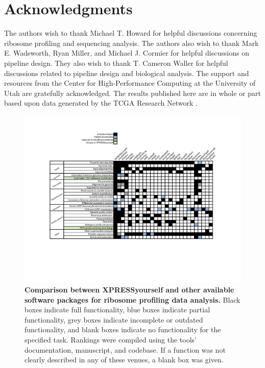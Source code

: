 \documentclass[10pt, oneside]{article}
\newcommand{\beginsupplement}{%
  \setcounter{table}{0}
  \renewcommand{\thetable}{S\arabic{table}}%
  \setcounter{figure}{0}
  \renewcommand{\thefigure}{S\arabic{figure}}%
}
\begin{document}
\section*{Acknowledgments}
The authors wish to thank Michael T. Howard for helpful discussions concerning ribosome profiling and sequencing analysis. The authors also wish to thank Mark E. Wadsworth, Ryan Miller, and Michael J. Cormier for helpful discussions on pipeline design. They also wish to thank T. Cameron Waller for helpful discussions related to pipeline design and biological analysis. The support and resources from the Center for High-Performance Computing at the University of Utah are gratefully acknowledged. The results published here are in whole or part based upon data generated by the TCGA Research Network \cite{tcga}.\\




\newpage
\beginsupplement

\begin{figure}
\centering
  \includegraphics[width=180mm]{figures/xpresspipe_supplement1.png}
  \caption{\textbf{Comparison between XPRESSyourself and other available software packages for ribosome profiling data analysis.} Black boxes indicate full functionality, blue boxes indicate partial functionality, grey boxes indicate incomplete or outdated functionality, and blank boxes indicate no functionality for the specified task. Rankings were compiled using the tools' documentation, manuscript, and codebase. If a function was not clearly described in any of these venues, a blank box was given.}
  \label{fig:supplement1}
\end{figure}
\end{document}
